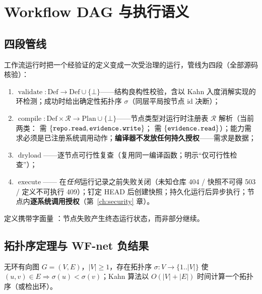 \chapter{Workflow DAG 与执行语义}\label{ch:workflow}

\section{四段管线}

工作流运行时把一个经验证的定义变成一次受治理的运行，管线为四段（全部源码核验）：
\begin{enumerate}[itemsep=0.1em]
  \item $\operatorname{validate}:\mathrm{Def}\to\mathrm{Def}\cup\{\bot\}$——结构良构性校验，含以 Kahn 入度消解实现的环检测；成功时给出确定性拓扑序 $\sigma$（同层平局按节点 id 决断）；
  \item $\operatorname{compile}:\mathrm{Def}\times\mathcal{R}\to\mathrm{Plan}\cup\{\bot\}$——节点类型对运行时注册表 $\mathcal{R}$ 解析（当前两类： 需 $\{\texttt{repo.read},\texttt{evidence.write}\}$； 需 $\{\texttt{evidence.read}\}$）；能力需求必须是已注册系统调用动作；\textbf{编译器不发放任何持久授权}——需求是数据；
  \item $\operatorname{dryload}$——逐节点可行性复查（复用同一编译函数；明示“仅可行性检查”）；
  \item $\operatorname{execute}$—— 在\emph{任何}运行记录之前失败关闭（未知仓库 404 / 快照不可得 503 / 定义不可执行 409）；钉定 HEAD 后创建快照；持久化运行后异步执行；节点内\textbf{逐系统调用授权}（第~\ref{ch:security} 章）。
\end{enumerate}
定义携带字面量 ：节点失败产生终态运行状态，而非部分继续。

\section{拓扑序定理与 WF-net 负结果}

\begin{theorem}[拓扑序存在性]\label{thm:topo}
无环有向图 $G=(V,E)$，$|V|\ge1$，存在拓扑序 $\sigma:V\to\{1..|V|\}$ 使 $(u,v)\in E\Rightarrow \sigma(u)<\sigma(v)$；Kahn 算法以 $O(|V|+|E|)$ 时间计算一个拓扑序（或检出环）。
\end{theorem}

